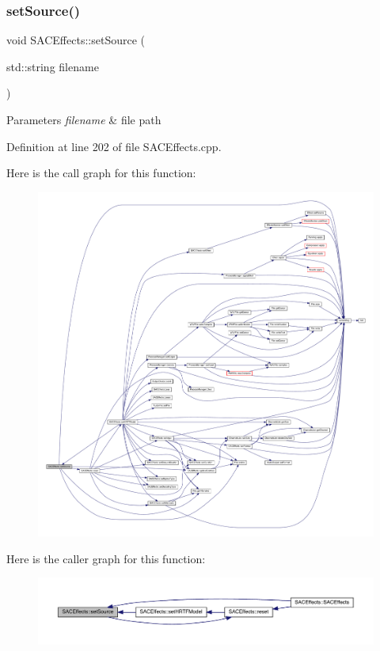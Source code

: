 \subsubsection{\texorpdfstring{set\+Source()}{setSource()}}
{\footnotesize\ttfamily void S\+A\+C\+Effects\+::set\+Source (\begin{DoxyParamCaption}\item[{std\+::string}]{filename }\end{DoxyParamCaption})}


\begin{DoxyParams}{Parameters}
{\em filename} & file path \\
\hline
\end{DoxyParams}


Definition at line 202 of file S\+A\+C\+Effects.\+cpp.

Here is the call graph for this function\+:
\nopagebreak
\begin{figure}[H]
\begin{center}
\leavevmode
\includegraphics[width=350pt]{class_s_a_c_effects_aaa9092eb132a8fe2b0560b3a600747b5_cgraph}
\end{center}
\end{figure}
Here is the caller graph for this function\+:
\nopagebreak
\begin{figure}[H]
\begin{center}
\leavevmode
\includegraphics[width=350pt]{class_s_a_c_effects_aaa9092eb132a8fe2b0560b3a600747b5_icgraph}
\end{center}
\end{figure}
\mbox{\label{class_s_a_c_effects_afd3f1f8b005595d4adf06d67c2bd556c}} 

